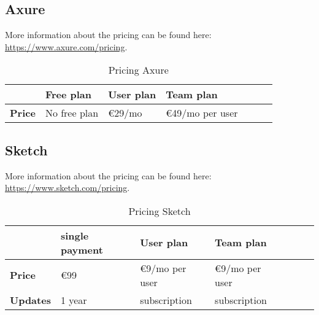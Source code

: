\subsection{Axure}
More information about the pricing can be found here: \url{https://www.axure.com/pricing}.
\begin{table}[H]
\centering
\begin{tabular}{ | l | l | l | l | l | l | l | }
  \toprule
                                & \textbf{Free plan}    & \textbf{User plan}    & \textbf{Team plan}    \\
  \midrule
  \textbf{Price}                & No free plan          & €29/mo                & €49/mo per user       \\
  \bottomrule
\end{tabular}
\captionsetup{justification=centering}
\caption{Pricing Axure \label{tab:pricing-axure}}
\end{table}

\subsection{Sketch}
More information about the pricing can be found here: \url{https://www.sketch.com/pricing}.
\begin{table}[H]
\centering
\begin{tabular}{ | l | l | l | l | l | l | l | }
  \toprule
                                & \textbf{single payment}   & \textbf{User plan}    & \textbf{Team plan}    \\
  \midrule
  \textbf{Price}                & €99                       & €9/mo per user        & €9/mo per user        \\
  \textbf{Updates}              & 1 year                    & subscription          & subscription          \\
  \bottomrule
\end{tabular}
\captionsetup{justification=centering}
\caption{Pricing Sketch \label{tab:pricing-sketch}}
\end{table}

